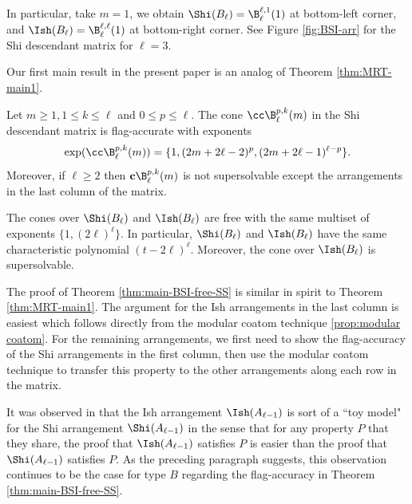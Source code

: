 In particular, take $m=1$, we obtain $\Shi(B_\ell) = \B^{\ell,1}_\ell(1)$ at bottom-left corner, and $\Ish(B_\ell) = \B^{\ell,\ell}_\ell(1)$ at bottom-right corner. 
See Figure \ref{fig:BSI-arr} for the Shi descendant  matrix for $\ell=3$.

Our first main result in the present paper is an analog of Theorem \ref{thm:MRT-main1}.
\begin{theorem}
 \label{thm:main-BSI-free-SS}
Let $m\ge 1, 1 \le k \le \ell$ and $0 \le p \le \ell$. 
The cone $\cc\B^{p,k}_\ell(m)$ in the Shi descendant matrix is flag-accurate with exponents 
$$\exp(\cc\B^{p,k}_\ell(m)) = \{1, (2m+2\ell-2)^{p}, (2m+2\ell-1)^{\ell-p}\} .$$ 
Moreover, if $\ell \ge 2$ then $\textbf{c} \B^{p,k}_\ell(m)$ is not supersolvable except the arrangements in the last column of the  matrix.
 \end{theorem}

\begin{corollary}\label{cor:Shi/Ish freeness and char poly}
The cones over $\Shi(B_{\ell})$ and $\Ish(B_{\ell})$ are free with the same multiset of exponents $\{1,(2\ell)^{\ell}\}$.
In particular, $\Shi(B_{\ell})$ and $\Ish(B_{\ell})$ have the same characteristic polynomial $(t-2\ell)^{\ell}$. 
Moreover, the cone over $\Ish(B_{\ell})$ is supersolvable. 
\end{corollary}
 
 The proof of Theorem \ref{thm:main-BSI-free-SS} is similar in spirit to Theorem \ref{thm:MRT-main1}. 
 The argument for the Ish arrangements in the last column is easiest which follows directly from the modular coatom technique \ref{prop:modular coatom}. 
 For the remaining arrangements, we first need to show the flag-accuracy of the Shi arrangements in the first column, then use the modular coatom technique to transfer this property to the other arrangements along each row in the matrix.
 
It was observed in \cite[\S1]{AR12} that the Ish arrangement $ \Ish(A_{\ell-1}) $ is sort of a ``toy model" for the Shi arrangement $ \Shi(A_{\ell-1}) $ in the sense that for any property $P$ that they share, the proof that $ \Ish(A_{\ell-1}) $ satisfies $P$ is easier than the proof that $ \Shi(A_{\ell-1}) $ satisfies $P$. 
 As the preceding paragraph suggests, this observation continues to be the case for type $B$ regarding the flag-accuracy in Theorem \ref{thm:main-BSI-free-SS}.

 
